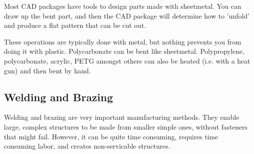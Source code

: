 \documentclass[10pt,letterpaper]{book}
\begin{document}
 	Most CAD packages have tools to design parts made with sheetmetal. You can draw up the bent part, and then the CAD package will determine how to 'unfold' and produce a flat pattern that can be cut out.
 	
 	These operations are typically done with metal, but nothing prevents you from doing it with plastic. Polycarbonate can be bent like sheetmetal. Polypropylene, polycarbonate, acrylic, PETG amongst others can also be heated (i.e. with a heat gun) and then bent by hand.
 	
 	\subsection{Welding and Brazing}
 	
 	Welding and brazing are very important manufacturing methods. They enable large, complex structures to be made from smaller simple ones, without fasteners that might fail. However, it can be quite time consuming, requires time consuming labor, and creates non-servicable structures.
 	
\end{document}
